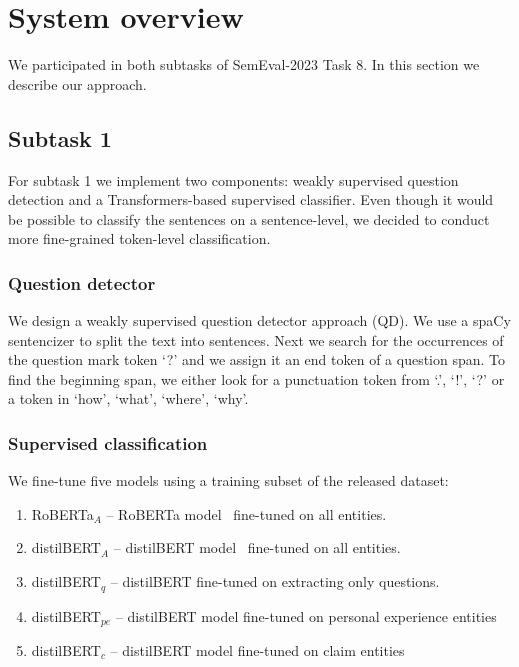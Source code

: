 \documentclass[11pt]{article}
\begin{document}
\section{System overview}
\label{sec:system_over}
%
We participated in both subtasks of SemEval-2023 Task 8. 
In this section we describe our approach.
%
%
%
\subsection{Subtask 1} \label{sec:system1}
\label{subsec:syst_task1}
%
For subtask 1 we implement two components: weakly supervised question detection and a Transformers-based supervised classifier.
Even though it would be possible to classify the sentences on a sentence-level, we decided to conduct more fine-grained token-level classification.
%
%
%
\subsubsection{Question detector}
\label{subsec:t1_questiondetect}
%
We design a weakly supervised question detector approach (QD).
We use a spaCy sentencizer to split the text into sentences.
Next we search for the occurrences of the question mark token `?' and we assign it an end token of a question span.
To find the beginning span, we either look for a punctuation token from `.’, `!’, `?’ or a token in `how’, ‘what’, ‘where’, `why’.
%
\subsubsection{Supervised classification}
\label{subsec:t1_classifi}
%
We fine-tune five models using a training subset of the released dataset:
%
%
%
\begin{enumerate}
\item RoBERTa$_A$ -- RoBERTa model~\cite{Liu2019RoBERTaAR} fine-tuned on all entities. %
\item distilBERT$_A$ -- distilBERT model~\cite{Sanh2019DistilBERTAD} fine-tuned on all entities.  %
\item  distilBERT$_q$ --  distilBERT fine-tuned on extracting only questions. %
\item distilBERT$_{pe}$ -- distilBERT model fine-tuned on personal experience entities %
\item distilBERT$_c$ -- distilBERT model fine-tuned on claim entities %
\end{enumerate}
\end{document}

